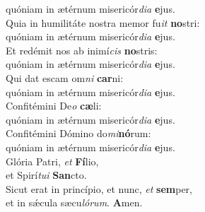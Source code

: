 \oddverse quóniam in ætérnum misericór\textit{di}\textit{a} \textbf{e}jus.\\
\evenverse Quia in humilitáte nostra memor fu\textit{it} \textbf{no}stri:~\*\\
\evenverse quóniam in ætérnum misericór\textit{di}\textit{a} \textbf{e}jus.\\
\oddverse Et redémit nos ab inimí\textit{cis} \textbf{no}stris:~\*\\
\oddverse quóniam in ætérnum misericór\textit{di}\textit{a} \textbf{e}jus.\\
\evenverse Qui dat escam om\textit{ni} \textbf{car}ni:~\*\\
\evenverse quóniam in ætérnum misericór\textit{di}\textit{a} \textbf{e}jus.\\
\oddverse Confitémini De\textit{o} \textbf{cæ}li:~\*\\
\oddverse quóniam in ætérnum misericór\textit{di}\textit{a} \textbf{e}jus.\\
\evenverse Confitémini Dómino do\textit{mi}\textbf{nó}rum:~\*\\
\evenverse quóniam in ætérnum misericór\textit{di}\textit{a} \textbf{e}jus.\\
\oddverse Glória Patri, \textit{et} \textbf{Fí}lio,~\*\\
\oddverse et Spirí\textit{tu}\textit{i} \textbf{San}cto.\\
\evenverse Sicut erat in princípio, et nunc, \textit{et} \textbf{sem}per,~\*\\
\evenverse et in sǽcula sæcu\textit{ló}\textit{rum}. \textbf{A}men.\\
